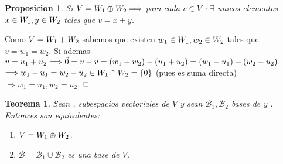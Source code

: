 \documentclass[]{article}
\newtheorem{theorem}{Teorema}
\newtheorem{proposition}{Proposicion}[theorem]
\newenvironment{proof}{\noindent{\bf Prueba:}}{$\hfill \Box$ \vspace{10pt}}
\newcommand{\ida}{\Longrightarrow}
\newcommand{\base}{\text{$\mathcal{B}$}}
\begin{document}
\begin{proposition}
    Si $V=\W{1} \oplus \W{2} \ida$ para cada $v\in V$ : $\exists$ unicos elementos $x \in \text{$W_{1}$} , y \in\text{$W_{2}$}$
    tales que $v=x+y$.
\end{proposition}
\begin{proof}
    Como $V=\text{$W_{1}$}+\text{$W_{2}$}$ sabemos que existen $w_1 \in \text{$W_{1}$}, w_2 \in \text{$W_{2}$}$ tales que $v=w_1=w_2$.
    Si ademas $v=u_1+u_2 \ida \cero= v-v= (w_1+w_2)-(u_1+u_2)=(w_1-u_1)+(w_2-u_2)$
    $\ida w_1-u_1 = w_2-u_2 \in \W{1}\cap\W{2}= \conjunto{0}$ (pues es suma directa) $\ida w_1=u_1 , w_2=u_2$.
\end{proof}

\begin{theorem}
    Sean , subespacios vectoriales de $V$ y sean $\base_1,\base_2$ bases de  y .\\
    Entonces son equivalentes:
    \begin{enumerate}
        \item $V=\text{$W_{1}$}\oplus\text{$W_{2}$}$.
        \item $\base = \base_1 \cup \base_2$ es una base de $V$.
    \end{enumerate}
\end{theorem}
\end{document}
